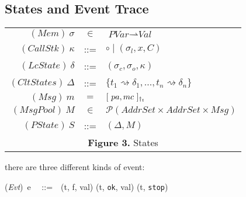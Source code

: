 \documentclass[UTF8, 8pt, a4paper ]{ctexart}
\newcommand{\inbuf}{\textit{Inbuf}\hspace{0.7mm}}
\begin{document}
\begin{small}
\begin{itemize}
\begin{comment}
			\end{itemize}
		
			\end{comment}
		
		
			
			
			
		
	\end{itemize}
	
	
	\subsection{States and Event Trace}
	
	
		\begin{longtable}{rcl}
			\hline			
			
			$ (\!\textit{Mem})\ \sigma $ & $ \in $ & $ \textit{PVar} \rightharpoonup \textit{Val} $\\
			
			
			$ (\!\textit{CallStk})\ \kappa $ & ::= & $ \circ \mid  (\sigma_l, x, C)$\\
			
			$ (\!\textit{LcState}) \ \delta $ & ::= & $ (\sigma_c, \sigma_o, \kappa)  $\\
			
			$ (\!\textit{CltStates})\ \varDelta  $ & ::= & $ \{ t_1 \rightsquigarrow {\delta}_1 , ..., t_n \rightsquigarrow {\delta}_n \} $\\
			
			$ (\!\textit{Msg})\ m $ & $ = $ & $ [\  pa, mc \ ]_{\dagger_{t}}  $\\
			
			$ (\!\textit{MsgPool})\ {M} $ & $ \in $ & $ \mathscr{P}(\! \textit{AddrSet}  \times \!\textit{AddrSet}\times \! \textit{Msg}) $\\
			
			$ (\!\textit{PState})\ {S} $ & ::= & $ (\varDelta, {M}) $\\			
			\hline
			
			\multicolumn{3}{c}{\textbf{Figure 3.} States} 
		\end{longtable}


		there are three different kinds of event:
		\begin{kfomula}{0.2}
			(\!\textit{Evt})\ e \ \ ::=\ \  (t, f, val) \mid (t, \texttt{ok}, val) \mid (t, \texttt{stop})
		\end{kfomula} 
	

\end{small}
\end{document}
